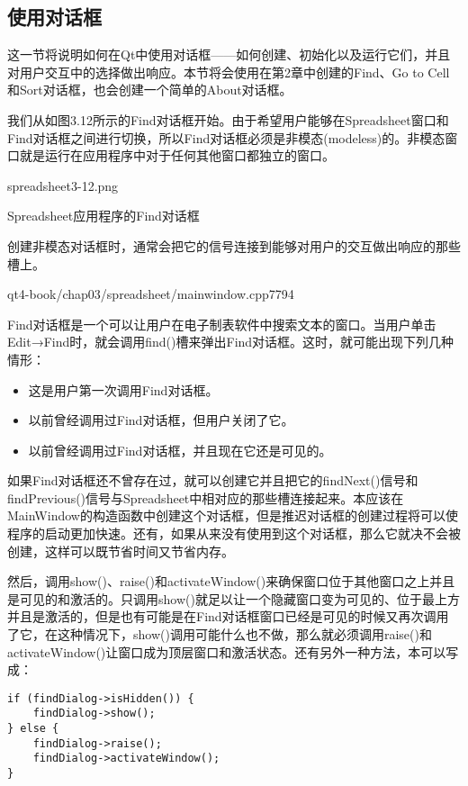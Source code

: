 \documentclass[11pt,oneside]{book}
\begin{document}
\begin{common-format}
\section{使用对话框}
这一节将说明如何在Qt中使用对话框——如何创建、初始化以及运行它们，并且对用户交互中的选择做出响应。本节将会使用在第2章中创建的Find、Go to Cell和Sort对话框，也会创建一个简单的About对话框。

我们从如图3.12所示的Find对话框开始。由于希望用户能够在Spreadsheet窗口和Find对话框之间进行切换，所以Find对话框必须是非模态(modeless)的。非模态窗口就是运行在应用程序中对于任何其他窗口都独立的窗口。
\begin{linefig}[0.6]{spreadsheet3-12.png}
\caption{Spreadsheet应用程序的Find对话框}
\label{fig:spreadsheet3-12.png}
\end{linefig}

创建非模态对话框时，通常会把它的信号连接到能够对用户的交互做出响应的那些槽上。
\begin{cppline}{qt4-book/chap03/spreadsheet/mainwindow.cpp}{77}{94}
\end{cppline}

Find对话框是一个可以让用户在电子制表软件中搜索文本的窗口。当用户单击Edit→Find时，就会调用find()槽来弹出Find对话框。这时，就可能出现下列几种情形：
\begin{itemize}
\item 这是用户第一次调用Find对话框。
\item 以前曾经调用过Find对话框，但用户关闭了它。
\item 以前曾经调用过Find对话框，并且现在它还是可见的。
\end{itemize}

如果Find对话框还不曾存在过，就可以创建它并且把它的findNext()信号和findPrevious()信号与Spreadsheet中相对应的那些槽连接起来。本应该在MainWindow的构造函数中创建这个对话框，但是推迟对话框的创建过程将可以使程序的启动更加快速。还有，如果从来没有使用到这个对话框，那么它就决不会被创建，这样可以既节省时间又节省内存。

然后，调用show()、raise()和activateWindow()来确保窗口位于其他窗口之上并且是可见的和激活的。只调用show()就足以让一个隐藏窗口变为可见的、位于最上方并且是激活的，但是也有可能是在Find对话框窗口已经是可见的时候又再次调用了它，在这种情况下，show()调用可能什么也不做，那么就必须调用raise()和activateWindow()让窗口成为顶层窗口和激活状态。还有另外一种方法，本可以写成：

\begin{Verbatim}
if (findDialog->isHidden()) {
    findDialog->show();
} else {
    findDialog->raise();
    findDialog->activateWindow();
}
\end{Verbatim}



\end{common-format}
\end{document}
